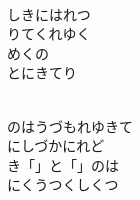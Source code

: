 \documentclass[10pt,b5j]{tarticle} %
\begin{document}
\begin{enumerate}
\begin{minipage}[c]{\blocksize}
        \vspace{\linespace}
        \item~\\
        しきにはれつ\\
        りてくれゆく\\
        めくの\\
        とにきてり
        
        \vspace{\linespace}
        \item~\\
        のはうづもれゆきて\\
        にしづかにれど\\
        き「」と「」のは\\
        にくうつくしくつ
    
    \end{minipage}
\end{enumerate} %
\end{document}
